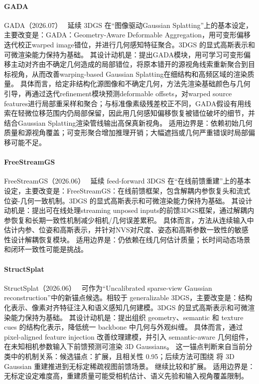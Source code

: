 \paragraph{GADA}
GADA（2026.07）~\cite{2607_00595} 延续 3DGS 在“图像驱动Gaussian Splatting”上的基本设定，主要改变是：GADA：Geometry-Aware Deformable Aggregation，用可变形偏移迭代校正warped image错位，并进行几何感知特征聚合。3DGS 的显式高斯表示和可微渲染能力保持为基础。
其设计动机是：提出GADA模块，用可学习可变形偏移主动对齐由不确定几何造成的局部错位，将原本错开的源视角线索重新聚合到目标视角，从而改善warping-based Gaussian Splatting在细结构和高频区域的渲染质量。
具体而言，给定非结构化源图像和不确定几何，方法先渲染基础颜色与几何引导，再通过迭代refinement模块预测deformable offsets，对warped source features进行局部重采样和聚合；与标准像素级残差校正不同，GADA假设有用线索在轻微位移范围内仍局部保留，因此用几何感知偏移恢复被错位破坏的细节，并结合Gaussian Splatting渲染管线输出高保真新视角。
适用边界是：依赖初始几何质量和源视角覆盖；可变形聚合增加推理开销；大幅遮挡或几何严重错误时局部偏移可能不足。

\paragraph{FreeStreamGS}
FreeStreamGS（2026.06）~\cite{2606_03254} 延续 feed-forward 3DGS 在“在线前馈重建”上的基本设定，主要改变是：FreeStreamGS：在线前馈框架，包含解耦内参恢复头和流式位姿-几何一致机制。3DGS 的显式高斯表示和可微渲染能力保持为基础。
其设计动机是：提出可在线处理streaming unposed inputs的前馈3DGS框架，通过解耦内参恢复和长期一致性机制减少相机/几何误差累积。
具体而言，方法从连续输入中估计内参、位姿和高斯表示，并针对NVS对尺度、姿态和高斯参数一致性的敏感性设计解耦恢复模块。
适用边界是：仍依赖在线几何估计质量；长时间动态场景和闭环一致性可能是挑战。

\paragraph{StructSplat}
StructSplat（2026.06）~\cite{2606_28321} 可作为“Uncalibrated sparse-view Gaussian reconstruction”中的新锚点候选。相较于 generalizable 3DGS，主要改变是：结构化表示、像素对齐特征注入和语义感知几何建模。3DGS 的显式高斯表示和可微渲染能力保持为基础。
其设计动机是：提出组织 geometry、semantic 和 texture cues 的结构化表示，降低统一 backbone 中几何与外观纠缠。
具体而言，通过 pixel-aligned feature injection 改善纹理建模，并引入 semantic-aware 几何组件，在未知相机参数输入下前馈预测可渲染 3D Gaussians。
这一锚点判断来自当前分类中的机制关系：候选锚点：扩展，且相关性 0.95；后续方法可围绕 将 3D Gaussian 重建推进到无标定稀疏视图前馈场景。 继续比较和扩展。
适用边界是：无标定设定难度高，重建质量可能受相机估计、语义先验和输入视角覆盖限制。

